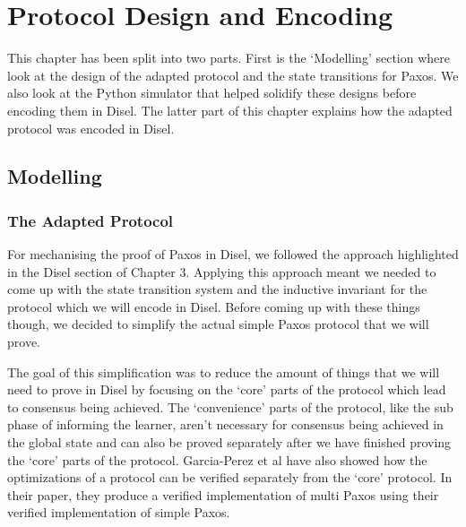 \chapter{Protocol Design and Encoding}

This chapter has been split into two parts. First is the `Modelling'
section where look at the design of the adapted protocol and the state
transitions for Paxos. We also look at the Python simulator
that helped solidify these designs before encoding them in Disel.
The latter part of this chapter explains how the adapted protocol was
encoded in Disel.

\section{Modelling}

\subsection{The Adapted Protocol}
For mechanising the proof of Paxos in Disel, we followed the approach highlighted
in the Disel section of Chapter 3. Applying this approach meant
we needed to come up with the state transition system and the inductive invariant
for the protocol which we will encode in Disel. Before coming up with these things
though, we decided to simplify the actual simple Paxos protocol that we will prove.

The goal of this simplification was to reduce the amount of things that we will need
to prove in Disel by focusing on the `core' parts of the protocol which
lead to consensus being achieved. The `convenience' parts of the protocol, like
the sub phase of informing the learner, aren't necessary for consensus being
achieved in the global state and can also be proved separately after we have
finished proving the `core' parts of the protocol. Garcia-Perez et al \cite{6}
have also showed how the optimizations of a protocol can be verified separately
from the `core' protocol. In their paper, they produce a verified implementation
of multi Paxos using their verified implementation of simple Paxos.

